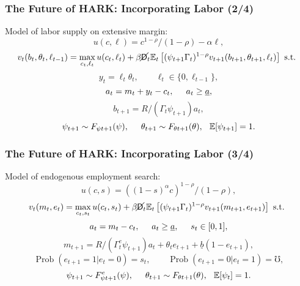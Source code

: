 \documentclass[11ptt]{beamer}
\newcommand{\Prob}{\operatorname{Prob}}
\newcommand{\E}{\mathbb{E}}
\newcommand{\Die}{\mathsf{D}}
\newcommand{\Live}{\cancel{\Die}}
\begin{document}
\begin{frame}
\frametitle{The Future of HARK: Incorporating Labor (2/4)}
Model of labor supply on extensive margin:
\begin{equation*}
u(c,\ell) = c^{1-\rho}/(1-\rho) - \alpha \ell,
\end{equation*}
\begin{equation*}
v_t(b_t,\theta_t,\ell_{t-1}) = \max_{c_t, \ell_t} u(c_t,\ell_t) + \beta \Live_t \E_t \left[(\psi_{t+1} \Gamma_t)^{1-\rho} v_{t+1}(b_{t+1},\theta_{t+1},\ell_t) \right] \text{ s.t. }
\end{equation*}
\begin{equation*}
y_t = \ell_t \theta_t, \qquad \ell_t \in \{0,\ell_{t-1}\},
\end{equation*}
\begin{equation*}
a_t = m_t + y_t - c_t, \hspace{0.5cm} a_t \geq \underline{a},
\end{equation*}
\begin{equation*}
b_{t+1} = R/(\Gamma_t \psi_{t+1}) a_t, 
\end{equation*}
\begin{equation*}
\psi_{t+1} \sim F_{\psi t+1}(\psi), \hspace{0.5cm} \theta_{t+1} \sim F_{\theta t+1}(\theta), \hspace{0.25cm} \E[\psi_{t+1}] = 1.
\end{equation*}
\end{frame}



\begin{frame}
\frametitle{The Future of HARK: Incorporating Labor (3/4)}
Model of endogenous employment search:
\begin{equation*}
u(c,s) = ((1-s)^\alpha c)^{1-\rho}/(1-\rho),
\end{equation*}
\begin{equation*}
v_t(m_t,e_t) = \max_{c_t,s_t} u(c_t,s_t) + \beta \Live_t \E_t \left[(\psi_{t+1} \Gamma_t)^{1-\rho} v_{t+1}(m_{t+1},e_{t+1}) \right] \text{ s.t. }
\end{equation*}
\begin{equation*}
a_t = m_t - c_t, \hspace{0.5cm} a_t \geq \underline{a}, \hspace{0.5cm} s_t \in [0,1],
\end{equation*}
\begin{equation*}
m_{t+1} = R/(\Gamma^e_t \psi_{t+1}) a_t + \theta_t e_{t+1} + \underline{b}(1-e_{t+1}), 
\end{equation*}
\begin{equation*}
\Prob(e_{t+1} = 1 | e_t = 0) = s_t, \qquad \Prob(e_{t+1} = 0 | e_t = 1) = \mho,
\end{equation*}
\begin{equation*}
\psi_{t+1} \sim F^e_{\psi t+1}(\psi), \hspace{0.5cm} \theta_{t+1} \sim F_{\theta t+1}(\theta), \hspace{0.25cm} \E[\psi_t] = 1.
\end{equation*}
\end{frame}
\end{document}
